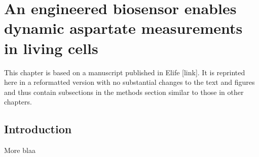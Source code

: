 \chapter{An engineered biosensor enables dynamic aspartate measurements in living cells}

This chapter is based on a manuscript published in Elife [link].
It is reprinted here in a reformatted version with no substantial changes to the text and figures and thus contain subsections in the methods section similar to those in other chapters.




\section{Introduction}
More blaa